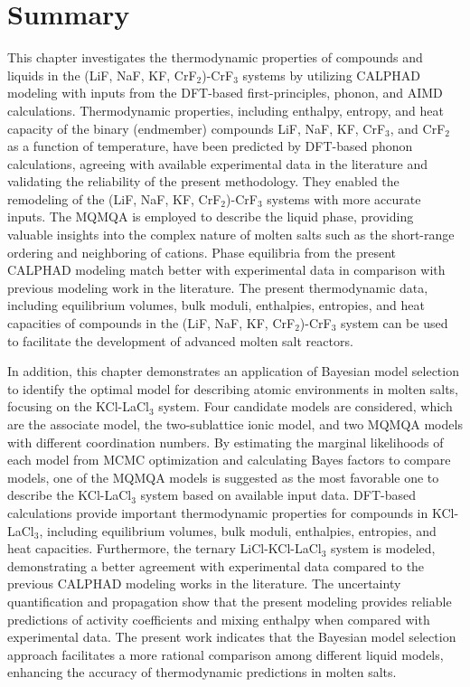 \section{Summary} \label{moltensalts:sec:Summary}
This chapter investigates the thermodynamic properties of compounds and liquids in the (LiF, NaF, KF, CrF$_2$)-CrF$_3$ systems by utilizing CALPHAD modeling with inputs from the DFT-based first-principles, phonon, and AIMD calculations. Thermodynamic properties, including enthalpy, entropy, and heat capacity of the binary (endmember) compounds LiF, NaF, KF, CrF$_3$, and CrF$_2$ as a function of temperature, have been predicted by DFT-based phonon calculations, agreeing with available experimental data in the literature and validating the reliability of the present methodology. They enabled the remodeling of the (LiF, NaF, KF, CrF$_2$)-CrF$_3$ systems with more accurate inputs. The MQMQA is employed to describe the liquid phase, providing valuable insights into the complex nature of molten salts such as the short-range ordering and neighboring of cations. Phase equilibria from the present CALPHAD modeling match better with experimental data in comparison with previous modeling work in the literature. The present thermodynamic data, including equilibrium volumes, bulk moduli, enthalpies, entropies, and heat capacities of compounds in the (LiF, NaF, KF, CrF$_2$)-CrF$_3$ system can be used to facilitate the development of advanced molten salt reactors.

In addition, this chapter demonstrates an application of Bayesian model selection to identify the optimal model for describing atomic environments in molten salts, focusing on the KCl-LaCl$_3$ system. Four candidate models are considered, which are the associate model, the two-sublattice ionic model, and two MQMQA models with different coordination numbers. By estimating the marginal likelihoods of each model from MCMC optimization and calculating Bayes factors to compare models, one of the MQMQA models is suggested as the most favorable one to describe the KCl-LaCl$_3$ system based on available input data. DFT-based calculations provide important thermodynamic properties for compounds in KCl-LaCl$_3$, including equilibrium volumes, bulk moduli, enthalpies, entropies, and heat capacities. Furthermore, the ternary LiCl-KCl-LaCl$_3$ system is modeled, demonstrating a better agreement with experimental data compared to the previous CALPHAD modeling works in the literature. The uncertainty quantification and propagation show that the present modeling provides reliable predictions of activity coefficients and mixing enthalpy when compared with experimental data. The present work indicates that the Bayesian model selection approach facilitates a more rational comparison among different liquid models, enhancing the accuracy of thermodynamic predictions in molten salts.